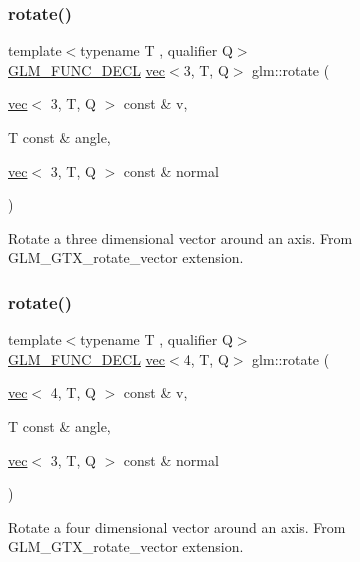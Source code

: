 \subsubsection{\texorpdfstring{rotate()}{rotate()}\hspace{0.1cm}{\footnotesize\ttfamily [2/3]}}
{\footnotesize\ttfamily template$<$typename T , qualifier Q$>$ \\
\hyperlink{setup_8hpp_ab2d052de21a70539923e9bcbf6e83a51}{G\+L\+M\+\_\+\+F\+U\+N\+C\+\_\+\+D\+E\+CL} \hyperlink{structglm_1_1vec}{vec}$<$3, T, Q$>$ glm\+::rotate (\begin{DoxyParamCaption}\item[{\hyperlink{structglm_1_1vec}{vec}$<$ 3, T, Q $>$ const \&}]{v,  }\item[{T const \&}]{angle,  }\item[{\hyperlink{structglm_1_1vec}{vec}$<$ 3, T, Q $>$ const \&}]{normal }\end{DoxyParamCaption})}

Rotate a three dimensional vector around an axis. From G\+L\+M\+\_\+\+G\+T\+X\+\_\+rotate\+\_\+vector extension. \mbox{\label{group__gtx__rotate__vector_ga1005f1267ed9c57faa3f24cf6873b961}} 
\subsubsection{\texorpdfstring{rotate()}{rotate()}\hspace{0.1cm}{\footnotesize\ttfamily [3/3]}}
{\footnotesize\ttfamily template$<$typename T , qualifier Q$>$ \\
\hyperlink{setup_8hpp_ab2d052de21a70539923e9bcbf6e83a51}{G\+L\+M\+\_\+\+F\+U\+N\+C\+\_\+\+D\+E\+CL} \hyperlink{structglm_1_1vec}{vec}$<$4, T, Q$>$ glm\+::rotate (\begin{DoxyParamCaption}\item[{\hyperlink{structglm_1_1vec}{vec}$<$ 4, T, Q $>$ const \&}]{v,  }\item[{T const \&}]{angle,  }\item[{\hyperlink{structglm_1_1vec}{vec}$<$ 3, T, Q $>$ const \&}]{normal }\end{DoxyParamCaption})}

Rotate a four dimensional vector around an axis. From G\+L\+M\+\_\+\+G\+T\+X\+\_\+rotate\+\_\+vector extension. \mbox{\label{group__gtx__rotate__vector_ga059fdbdba4cca35cdff172a9d0d0afc9}} 
